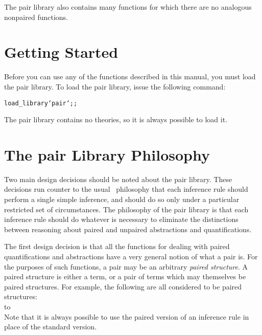 The pair library also contains many functions for which there are no
analogous nonpaired functions.

\section{Getting Started}

Before you can use any of the functions described in this manual,
you must load the pair library.
To load the pair library, issue the following command:
\begin{hol}\begin{alltt}
    load_library `pair`;;
\end{alltt}\end{hol}
The pair library contains no theories, so it is always possible to load it.

\section{The pair Library Philosophy}

Two main design decisions should be noted about the pair library.
These decisions run counter to the usual \HOL\ philosophy that each
inference rule should perform a single simple inference,
and should do so only under a particular restricted set of circumstances.
The philosophy of the pair library is that each
inference rule should do whatever is necessary to eliminate the distinctions
between reasoning about paired and unpaired abstractions and quantifications.

The first design decision is that all the functions for dealing with paired
quantifications and abstractions have a very general notion of what a pair is.
For the purposes of such functions, a pair may be an arbitrary
{\it paired structure}.
A paired structure is either a term,
or a pair of terms which may themselves be paired structures.
For example, the following are all considered to be paired structures:  \\
\noindent
\hbox to \textwidth{\tt
    \hfil
    a
    \hfil
    (a,b)
    \hfil
    (a,b,c)
    \hfil
    ((a1,a2),(b1,b2))
    \hfil
    ((a1,a2),(b2,b2),(c1,c2))
    \hfil
}\\
\noindent
Note that it is always possible to use the paired version
of an inference rule in place of the standard version.


